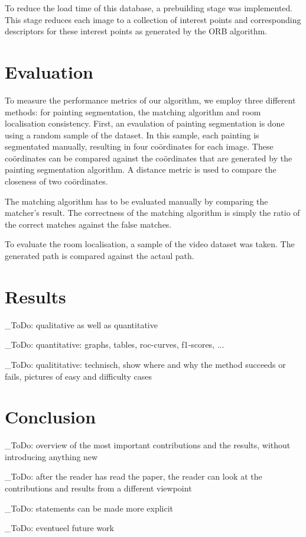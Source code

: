 \documentclass[10pt,final,journal]{IEEEtran}
\newcommand{\todo}[1]{\color{red}\_ToDo: #1 \color{black}}
\begin{document}
	To reduce the load time of this database, a prebuilding stage was implemented. This stage reduces each image to a collection of interest points and corresponding descriptors for these interest points as generated by the ORB \cite{Rublee2011} algorithm. 
	
	
	\section{Evaluation}
	To measure the performance metrics of our algorithm, we employ three different methods: for painting segmentation, the matching algorithm and room localisation consistency. First, an evaulation of painting segmentation is done using a random sample of the dataset. In this sample, each painting is segmentated manually, resulting in four coördinates for each image. These coördinates can be compared against the coördinates that are generated by the painting segmentation algorithm. A distance metric is used to compare the closeness of two coördinates.
	
	The matching algorithm has to be evaluated manually by comparing the matcher's result. The correctness of the matching algorithm is simply the ratio of the correct matches against the false matches.
	
	To evaluate the room localisation, a sample of the video dataset was taken. The generated path is compared against the actaul path.
	
	
	
	
	
	
	\section{Results}
	\todo{qualitative as well as quantitative}
	
	\todo{quantitative: graphs, tables, roc-curves, f1-scores, ...}
	
	\todo{qualititative: technisch, show where and why the method succeeds or fails, pictures of easy and difficulty cases}
	
	\section{Conclusion}
	\todo{overview of the most important contributions and the results, without introducing anything new}
	
	\todo{after the reader has read the paper, the reader can look at the contributions and results from a different viewpoint}
	
	\todo{statements can be made more explicit}
	
	\todo{eventueel future work}

	
	
\end{document}
